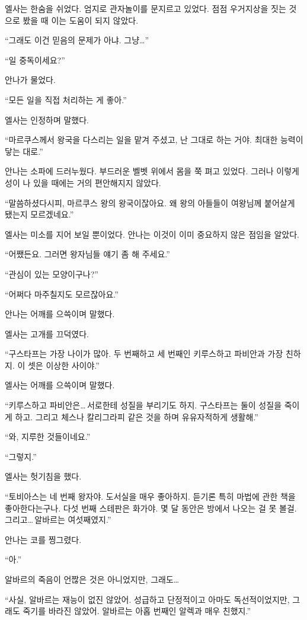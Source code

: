 엘사는 한숨을 쉬었다. 엄지로 관자놀이를 문지르고 있었다. 점점 우거지상을 짓는 것으로 봤을 때 이는 도움이 되지 않았다.

``그래도 이건 믿음의 문제가 아냐. 그냥\ldots''

``일 중독이세요?''

안나가 물었다.

``모든 일을 직접 처리하는 게 좋아.''

엘사는 인정하며 말했다.

``마르쿠스께서 왕국을 다스리는 일을 맡겨 주셨고, 난 그대로 하는 거야. 최대한 능력이 닿는 대로.''

안나는 소파에 드러누웠다. 부드러운 벨벳 위에서 몸을 쭉 펴고 있었다. 그러나 이렇게 성이 나 있을 때에는 거의 편안해지지 않았다.

``말씀하셨다시피, 마르쿠스 왕의 왕국이잖아요. 왜 왕의 아들들이 여왕님께 붙어살게 됐는지 모르겠네요.''

엘사는 미소를 지어 보일 뿐이었다. 안나는 이것이 이미 중요하지 않은 점임을 알았다.

``어쨌든요. 그러면 왕자님들 얘기 좀 해 주세요.''

``관심이 있는 모양이구나?''

``어쩌다 마주칠지도 모르잖아요.''

안나는 어깨를 으쓱이며 말했다.

엘사는 고개를 끄덕였다.

``구스타프는 가장 나이가 많아. 두 번째하고 세 번째인 키루스하고 파비안과 가장 친하지. 이 셋은 이상한 사이야.''

엘사는 어깨를 으쓱이며 말했다.

``키루스하고 파비안은\ldots\,서로한테 성질을 부리기도 하지. 구스타프는 둘이 성질을 죽이게 하고. 그리고 체스나 칼리그라피 같은 것을 하며 유유자적하게 생활해.''

``와, 지루한 것들이네요.''

`` 그렇지.''

엘사는 헛기침을 했다.

``토비아스는 네 번째 왕자야. 도서실을 매우 좋아하지. 듣기론 특히 마법에 관한 책을 좋아한다는구나. 다섯 번째 스테판은 화가야. 몇 달 동안은 방에서 나오는 걸 못 볼걸. 그리고\ldots\,알바르는 여섯째였지.''

안나는 코를 찡그렸다.

``아.''

알바르의 죽음이 언짢은 것은 아니었지만, 그래도\ldots

``사실, 알바르는 재능이 없진 않았어. 성급하고 단정적이고 아마도 독선적이었지만, 그래도 죽기를 바라진 않았어. 알바르는 아홉 번째인 알렉과 매우 친했지.''

